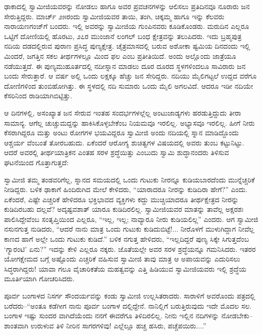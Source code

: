 ಢಾಕಾದಲ್ಲಿ ಸ್ವಾಮೀಜಿಯವರನ್ನು ನೋಡಲು ಹಾಗೂ ಅವರ ಪ್ರವಚನಗಳನ್ನು ಆಲಿಸಲು ಪ್ರತಿದಿನವೂ ನೂರಾರು ಜನ ಸೇರುತ್ತಿದ್ದರು. ಮಾರ್ಚ್ ೨೫ರಂದು ಸ್ವಾಮೀಜಿಯವರ ತಾಯಿ, ತಂಗಿ, ಚಿಕ್ಕಮ್ಮ ಹಾಗೂ ಇನ್ನು ಕೆಲವರು ನಾರಾಯಣಗಂಜ್​ಗೆ ಬಂದರು. ಇಲ್ಲಿ ಅವರನ್ನು ಸ್ವಾಮೀಜಿಯ ಗುಂಪಿನವರು ಕೂಡಿಕೊಂಡರು. ಮರುದಿನ ಎಲ್ಲರೂ ಒಟ್ಟಿಗೆ ದೋಣಿಯಲ್ಲಿ ಹೊರಟು, ೨೭ರ ಮುಂಜಾನೆ ಲಂಗಲ್ ಬಂಧ ಕ್ಷೇತ್ರವನ್ನು ತಲುಪಿದರು. ಇದು ಬ್ರಹ್ಮಪುತ್ರ ನದಿಯ ದಡದಲ್ಲಿರುವ ಪುರಾಣ ಪ್ರಸಿದ್ಧ ಪುಣ್ಯಕ್ಷೇತ್ರ. ಚೈತ್ರಮಾಸದಲ್ಲಿ ಬರುವ ಅಶೋಕಾ ಷ್ಟಮಿಯ ದಿನದಂದು ಇಲ್ಲಿ ಮಿಂದರೆ, ಜಗತ್ತಿನ ಸಕಲ ತೀರ್ಥಗಳಲ್ಲೂ ಮಿಂದ ಫಲ ಎಂಬ ಪ್ರತೀತಿಯಿದೆ. ಅಂದು ಅಲ್ಲೊಂದು ಜಾತ್ರೆಯೂ ನಡೆಯುತ್ತದೆ. ಈ ಪುಣ್ಯಮುಹೂರ್ತದಲ್ಲಿ ನದೀಸ್ನಾನ ಮಾಡಲು ದೂರ ದೂರದ ಸ್ಥಳಗಳಿಂದಲೂ ಸಾವಿರಾರು ಜನ ಬಂದು ಸೇರುತ್ತಾರೆ. ಆ ವರ್ಷ ಅಲ್ಲಿ ಒಂದು ಲಕ್ಷಕ್ಕೂ ಹೆಚ್ಚು ಜನ ಸೇರಿದ್ದರು. ನದಿಯು ಮೈಲಿಗಟ್ಟಲೆ ಉದ್ದದ ವರೆಗೂ ದೋಣಿಗಳಿಂದ ತುಂಬಿಹೋಗಿತ್ತು. ಈ ಸ್ಥಳದಲ್ಲಿ ನದಿ ಸುಮಾರು ಒಂದು ಮೈಲಿ ಅಗಲವಿದೆ. ಆದರೂ ಇಡೀ ನದಿಯೇ ಕೆಸರಿನಿಂದ ರಾಡಿಯಾಗಿಬಿಟ್ಟಿತ್ತು.

ಆ ದಿನಗಳಲ್ಲಿ, ಅಸಂಖ್ಯಾತ ಜನ ಸೇರುವ ಇಂತಹ ಸಂದರ್ಭಗಳಲ್ಲೆಲ್ಲ ಅಂಟುಜಾಡ್ಯಗಳು ಹರಡುತ್ತಿದ್ದುದು ತೀರಾ ಸಾಮಾನ್ಯ. ಆಗೆಲ್ಲ ಚುಚ್ಚುಮದ್ದನ್ನು ಹಾಕಿಸಿಕೊಳ್ಳಬೇಕೆಂಬ ನಿಯಮವೂ ಇರಲಿಲ್ಲ. ಅಭ್ಯಾಸವೂ ಇರಲಿಲ್ಲ. ಹೀಗೆ ನೀರು ಕೆಸರಾಗಿದ್ದರೂ ಮತ್ತು ಅಂಟು ರೋಗಗಳ ಭಯವಿದ್ದರೂ ಸ್ವಾಮೀಜಿ ಅಂದು ನದಿಯಲ್ಲಿ ಸ್ನಾನ ಮಾಡಿದ್ದೊಂದು ಆಶ್ಚರ್ಯ ವೆಂಬಂತೆ ತೋರಬಹುದು. ಏಕೆಂದರೆ ಆರೋಗ್ಯ ಶುಚಿತ್ವಗಳ ವಿಷಯದಲ್ಲಿ ಅವರು ತುಂಬ ಕಟ್ಟುನಿಟ್ಟು. ಆದರೆ ಅವರಲ್ಲಿ ತೀರ್ಥಯಾತ್ರಿಕನ ಎಂತಹ ಸರಳ ಶ್ರದ್ಧೆಯಿತ್ತು ಎಂಬುದು ಸ್ವಾಮಿ ಶುದ್ಧಾನಂದರು ತಿಳಿಸುವ ಘಟನೆಯಿಂದ ಗೊತ್ತಾಗುತ್ತದೆ:

ಸ್ವಾಮೀಜಿ ತಮ್ಮ ತಂಡವರಿಗೆಲ್ಲ, ಸ್ನಾನದ ಸಮಯದಲ್ಲಿ ಒಂದು ಗುಟುಕು ನೀರನ್ನೂ ಕುಡಿಯಬಾರದೆಂದು ಮುನ್ನೆಚ್ಚರಿಕೆ ನೀಡಿದ್ದರು. ಬಳಿಕ ಢಾಕಾಗೆ ಹಿಂದಿರುಗಿದ ಮೇಲೆ ಕೇಳಿದರು, “ಯಾರಾದರೂ ನೀರನ್ನು ಕುಡಿದಿರಾ ಹೇಗೆ?” ಎಂದು. ಏಕೆಂದರೆ, ಎಷ್ಟೇ ಎಚ್ಚರಿಕೆ ಹೇಳಿದರೂ ಭಕ್ತಿಭಾವದ ವ್ಯಕ್ತಿಗಳು ಕದ್ದು ಮುಚ್ಚಿಯಾದರೂ ತೀರ್ಥಕ್ಷೇತ್ರದ ನೀರನ್ನು ಕುಡಿದಿರಬಹು ದಲ್ಲವೆ? ಅದೃಷ್ಟವಶಾತ್ ಯಾರೂ ಕುಡಿದಿರಲಿಲ್ಲ. ಸ್ವಾಮೀಜಿಯವರ ಮಾತನ್ನು ತಾವೆಲ್ಲ ಅಕ್ಷರಶಃ ಪಾಲಿಸಿದ್ದೇವೆಂಬ ಸಂತೃಪ್ತಿಯಿಂದ ಎಲ್ಲರೂ, “ಇಲ್ಲ, ಇಲ್ಲ; ನಾವ್ಯಾರೂ ನೀರು ಕುಡಿಯಲಿಲ್ಲ” ಎಂದರು. ಆಗ ಸ್ವಾಮೀಜಿ ನಸುನಗುತ್ತ ನುಡಿದರು, “ಆದರೆ ನಾನು ಮಾತ್ರ ಒಂದು ಗುಟುಕು ಕುಡಿದುಬಿಟ್ಟೆ!... ನೀರೊಳಗೆ ಮುಳುಗಿದ್ದಾಗ ನೀವೆಲ್ಲ ಕಾಣದ ಹಾಗೆ ಅಲ್ಲೇ ಒಂದು ಗುಟುಕು ಕುಡಿದೆ.” ಬಳಿಕ ನಗುತ್ತ ಹೇಳಿದರು, “ಇಲ್ಲದಿದ್ದರೆ ಪುಣ್ಯ ಸಿಕ್ಕೇ ಸಿಗುತ್ತದೆಂಬ ‘ಗ್ಯಾರಂಟಿ’ ಏನು?” ಇದನ್ನು ಕೇಳಿ ಎಲ್ಲರೂ ನಕ್ಕರು. ಜೊತೆಯಲ್ಲೇ ಅವರ ಸರಳ ಶ್ರದ್ಧೆಯನ್ನೂ ಗಮನಿಸಿದರು. ಇತರರ ಯೋಗಕ್ಷೇಮದ ಬಗ್ಗೆ ಅಷ್ಟೊಂದು ಎಚ್ಚರಿಕೆ ವಹಿಸುವ ಸ್ವಾಮೀಜಿ ತಾವು ಮಾತ್ರ ಆ ಅಪಾಯವನ್ನು ಎದುರಿಸಲು ಸಿದ್ಧರಾಗಿದ್ದರು! ಯಾವಾ ಗಲೂ ವೈಚಾರಿಕತೆಯ ಮಹತ್ವವನ್ನು ಎತ್ತಿ ಹಿಡಿಯುವ ಸ್ವಾಮೀಜಿಯವರು ಇಲ್ಲಿ ಶ್ರದ್ಧೆಯ ಮೂರ್ತಿಯಾಗಿ ಗೋಚರಿಸಿದರು.

ಪೂರ್ವ ಬಂಗಾಳದ ನಿಸರ್ಗ ಸೌಂದರ್ಯವನ್ನು ಕಂಡು ಸ್ವಾಮೀಜಿ ಉಲ್ಲಸಿತರಾದರು. ಸಾರಾಳಿಗೆ ಅವರೊಂದು ಪತ್ರದಲ್ಲಿ ಬರೆದರು–“ಅಂತೂ ಕಡೆಗೀಗ ನಾನು ಪೂರ್ವ ಬಂಗಾಳ ದಲ್ಲಿದ್ದೇನೆ. ನಾನಿಲ್ಲಿಗೆ ಬರುತ್ತಿರುವುದು ಇದೇ ಮೊದಲ ಸಲ. ಬಂಗಾಳ ಇಷ್ಟು ಸುಂದರ ವಾಗಿದೆಯೆಂದು ನನಗೆ ಈವರೆಗೂ ತಿಳಿದಿರಲಿಲ್ಲ. ನೀನು ಇಲ್ಲಿನ ನದಿಗಳನ್ನು ನೋಡಬೇಕು– ಶಾಂತವಾಗಿ ಉರುಳುವ ತಿಳಿ ನೀರಿನ ಸಾಗರಗಳಿವು! ಎಲ್ಲೆಲ್ಲೂ ಹಚ್ಚ ಹಸಿರು, ಪಚ್ಚೆಪಯಿರು....”

